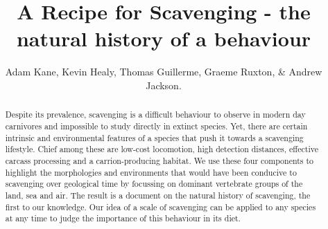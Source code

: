 \documentclass[a4paper,12pt]{article}
\title{A Recipe for Scavenging - the natural history of a behaviour}
\author{Adam Kane, Kevin Healy, Thomas Guillerme, Graeme Ruxton, \& Andrew Jackson.}
\begin{document}
\maketitle


\begin{abstract} 
Despite its prevalence, scavenging is a difficult behaviour to observe in modern day carnivores and impossible to study directly in extinct species. 
Yet, there are certain intrinsic and environmental features of a species that push it towards a scavenging lifestyle. Chief among these are low-cost locomotion, high detection distances, effective carcass processing and a carrion-producing habitat. 
We use these four components to highlight the morphologies and environments that would have been conducive to scavenging over geological time by focussing on dominant vertebrate groups of the land, sea and air. 
The result is a document on the natural history of scavenging, the first to our knowledge. 
Our idea of a scale of scavenging can be applied to any species at any time to judge the importance of this behaviour in its diet. 
\end{abstract}

\newpage
\end{document}
